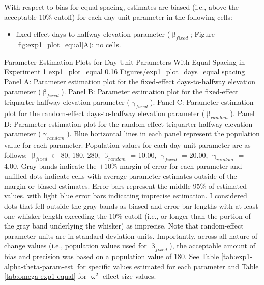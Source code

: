 \documentclass[
12pt, %
twoside,
english]{guelphthesis}
\theoremstyle{definition}
\theoremstyle{definition}
\theoremstyle{definition}
\theoremstyle{definition}
\theoremstyle{remark}
\begin{document}
With respect to bias for equal spacing, estimates are biased (i.e., above the acceptable 10\% cutoff) for each day-unit parameter in the following cells:
\begin{itemize}
\tightlist
\item
  fixed-effect days-to-halfway elevation parameter (\(\upbeta_{fixed}\); Figure \ref{fig:exp1_plot_equal}A): no cells.
\end{itemize}
\begin{apaFigure}
[portrait]
[samepage]
[0cm]
{Parameter Estimation Plots for Day-Unit Parameters With Equal Spacing in Experiment 1}
{exp1_plot_equal}
{0.16}
{Figures/exp1_plot_days_equal spacing}
{Panel A: Parameter estimation plot for the fixed-effect days-to-halfway elevation parameter ($\upbeta_{fixed}$). Panel B: Parameter estimation plot for the fixed-effect triquarter-halfway elevation parameter ($\upgamma_{fixed}$). Panel C: Parameter estimation plot for the random-effect days-to-halfway elevation parameter ($\upbeta_{random}$). Panel D: Parameter estimation plot for the random-effect triquarter-halfway elevation parameter ($\upgamma_{random}$). Blue horizontal lines in each panel represent the population value for each parameter. Population values for each day-unit parameter are as follows: $\upbeta_{fixed} \in$ {80, 180, 280}, $\upbeta_{random}$ = 10.00, $\upgamma_{fixed}$ = 20.00, $\upgamma_{random}$ = 4.00. Gray bands indicate the $\pm 10\%$ margin of error for each parameter and unfilled dots indicate cells with average parameter estimates outside of the margin or biased estimates. Error bars represent the middle 95\% of estimated values, with light blue error bars indicating imprecise estimation. I considered dots that fell outside the gray bands as biased and error bar lengths with at least one whisker length exceeding the 10\% cutoff (i.e., or longer than the portion of the gray band underlying the whisker) as imprecise. Note that random-effect parameter units are in standard deviation units. Importantly, across all nature-of-change values (i.e., population values used for $\upbeta_{fixed}$), the acceptable amount of bias and precision was based on a population value of 180. See Table \ref{tab:exp1-alpha-theta-param-est} for specific values estimated for each parameter and Table \ref{tab:omega-exp1-equal} for $\upomega^2$ effect size values.}
\end{apaFigure}
\end{document}
